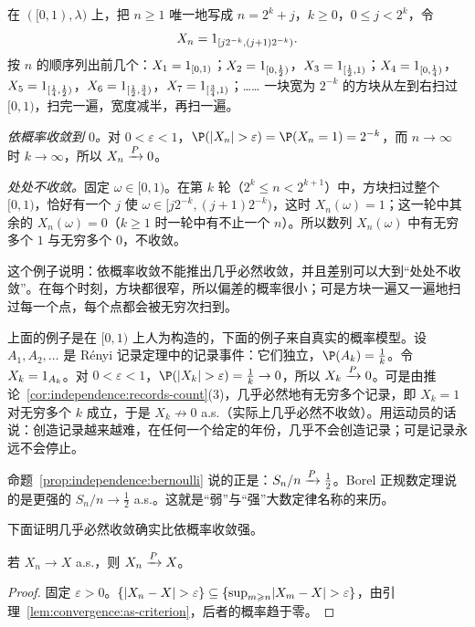 \begin{example}\label{ex:convergence:typewriter}
在 $([0,1),\lambda)$ 上，把 $n\geqslant1$ 唯一地写成 $n=2^k+j$，$k\geqslant0$，$0\leqslant j<2^k$，令
\[
X_n=1_{[j2^{-k},(j+1)2^{-k})}.
\]
按 $n$ 的顺序列出前几个：$X_1=1_{[0,1)}$；$X_2=1_{[0,\frac12)}$，$X_3=1_{[\frac12,1)}$；$X_4=1_{[0,\frac14)}$，$X_5=1_{[\frac14,\frac12)}$，$X_6=1_{[\frac12,\frac34)}$，$X_7=1_{[\frac34,1)}$；…… 一块宽为 $2^{-k}$ 的方块从左到右扫过 $[0,1)$，扫完一遍，宽度减半，再扫一遍。

\emph{依概率收敛到 $0$。}对 $0<\varepsilon<1$，$\P(\abs{X_n}>\varepsilon)=\P(X_n=1)=2^{-k}$，而 $n\to\infty$ 时 $k\to\infty$，所以 $X_n\xrightarrow{P}0$。

\emph{处处不收敛。}固定 $\omega\in[0,1)$。在第 $k$ 轮（$2^k\leqslant n<2^{k+1}$）中，方块扫过整个 $[0,1)$，恰好有一个 $j$ 使 $\omega\in[j2^{-k},(j+1)2^{-k})$，这时 $X_n(\omega)=1$；这一轮中其余的 $X_n(\omega)=0$（$k\geqslant1$ 时一轮中有不止一个 $n$）。所以数列 $X_n(\omega)$ 中有无穷多个 $1$ 与无穷多个 $0$，不收敛。

这个例子说明：依概率收敛不能推出几乎必然收敛，并且差别可以大到“处处不收敛”。在每个时刻，方块都很窄，所以偏差的概率很小；可是方块一遍又一遍地扫过每一个点，每个点都会被无穷次扫到。
\end{example}

\begin{example}[独立的小概率事件]\label{ex:convergence:independent-events}
上面的例子是在 $[0,1)$ 上人为构造的，下面的例子来自真实的概率模型。设 $A_1,A_2,\dots$ 是 Rényi 记录定理中的记录事件：它们独立，$\P(A_k)=\frac1k$。令 $X_k=1_{A_k}$。对 $0<\varepsilon<1$，$\P(\abs{X_k}>\varepsilon)=\frac1k\to0$，所以 $X_k\xrightarrow{P}0$。可是由推论~\ref{cor:independence:records-count}(3)，几乎必然地有无穷多个记录，即 $X_k=1$ 对无穷多个 $k$ 成立，于是 $X_k\not\to0$ a.s.（实际上几乎必然不收敛）。用运动员的话说：创造记录越来越难，在任何一个给定的年份，几乎不会创造记录；可是记录永远不会停止。
\end{example}

\begin{example}[弱大数定律]
命题~\ref{prop:independence:bernoulli} 说的正是：$S_n/n\xrightarrow{P}\frac12$。Borel 正规数定理说的是更强的 $S_n/n\to\frac12$ a.s.。这就是“弱”与“强”大数定律名称的来历。
\end{example}

下面证明几乎必然收敛确实比依概率收敛强。

\begin{theorem}\label{thm:convergence:as-implies-p}
若 $X_n\to X$ a.s.，则 $X_n\xrightarrow{P} X$。
\end{theorem}
\begin{proof}
固定 $\varepsilon>0$。$\{\lvert X_n-X\rvert>\varepsilon\}\subseteq\{\sup_{m\geqslant n}\lvert X_m-X\rvert>\varepsilon\}$，由引理~\ref{lem:convergence:as-criterion}，后者的概率趋于零。
\end{proof}

